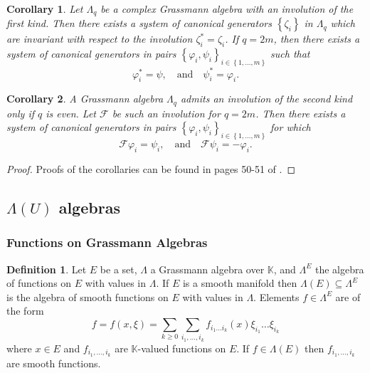 \documentclass{article}
\newtheorem{corollary}{Corollary}[theorem]
\theoremstyle{definition}
\newtheorem{definition}{Definition}
\begin{document}
\begin{corollary}
    Let $\Lambda_q$ be a complex Grassmann algebra with an involution of the first kind. Then there exists a system of canonical generators $\left\{ \zeta_i \right\}$ in $\Lambda_q$ which are invariant with respect to the involution $\zeta_i^* = \zeta_i$. If $q = 2m$, then there exists a system of canonical generators in pairs $\left\{ \varphi_i, \psi_i \right\}_{i \in \left\{ 1, \dots, m \right\}}$ such that
    \begin{equation*}
        \varphi_i^* = \psi, \quad \text{and} \quad \psi_i^* = \varphi_i.
    \end{equation*}
\end{corollary}

\begin{corollary}
    A Grassmann algebra $\Lambda_q$ admits an involution of the second kind only if $q$ is even. Let $\mathcal{F}$ be such an involution for $q = 2m$. Then there exists a system of canonical generators in pairs $\left\{ \varphi_i, \psi_i \right\}_{i \in \left\{ 1, \dots, m \right\}}$ for which
    \begin{equation*}
        \mathcal{F} \varphi_i = \psi_i, \quad \text{and} \quad
        \mathcal{F} \psi_i = - \varphi_i.
    \end{equation*}
\end{corollary}

\begin{proof}
    Proofs of the corollaries can be found in pages 50-51 of \cite{berezin_introduction_1987}.
\end{proof}


\subsection{$\Lambda (U)$ algebras}

\subsubsection{Functions on Grassmann Algebras}

\begin{definition}
    Let $E$ be a set, $\Lambda$ a Grassmann algebra over $\mathbb{K}$, and $\Lambda^E$ the algebra of functions on $E$ with values in $\Lambda$. If $E$ is a smooth manifold then $\Lambda(E) \subseteq \Lambda^E$ is the algebra of smooth functions on $E$ with values in $\Lambda$. Elements $f \in \Lambda^E$ are of the form
        \begin{equation*}
            \label{eq:functions_grassmann_algebra}
            f = f(x, \xi) = \sum_{k \geq 0} \sum_{i_1, \dots, i_k}
            f_{i_1 \dots i_k}(x) \xi_{i_1} \dots \xi_{i_k}
        \end{equation*}
    where $x \in E$ and $f_{i_1, \dots, i_k}$ are $\mathbb{K}$-valued functions on $E$. If $f \in \Lambda(E)$ then $f_{i_1, \dots, i_k}$ are smooth functions.
\end{definition}
\end{document}
